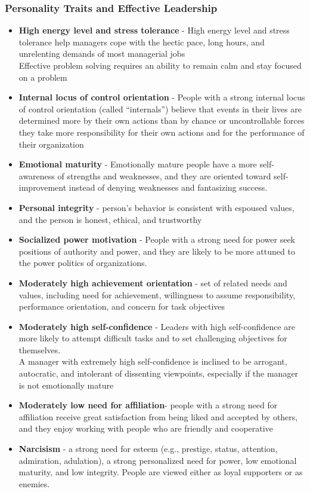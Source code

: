 \subsubsection{Personality Traits and Effective Leadership} %
\label{ssub:personality_traits_and_effective_leadership}


\begin{itemize}
	\item \textbf{High energy level and stress tolerance} - High energy level and stress tolerance help managers cope with the hectic pace, long hours, and unrelenting demands of most managerial jobs
	\\Effective problem solving requires an ability to remain calm and stay focused on a problem
	\item \textbf{Internal locus of control orientation} - People with a strong internal locus of control orientation (called “internals”) believe that events in their lives are determined more by their own actions than by chance or uncontrollable forces 
	\\they take more responsibility for their own actions and for the performance of their organization
	\item \textbf{Emotional maturity} - Emotionally mature people have a more self-awareness of strengths and weaknesses, and they are oriented toward self-improvement instead of denying weaknesses and fantasizing success.
	\item \textbf{Personal integrity} - person’s behavior is consistent with espoused values, and the person is honest, ethical, and trustworthy
	\item \textbf{Socialized power motivation} - People with a strong need for power seek positions of authority and power, and they are likely to be more attuned to the power politics of organizations.
	\item \textbf{Moderately high achievement orientation} - set of related needs and values, including need for achievement, willingness to assume responsibility, performance orientation, and concern for task objectives
	\item \textbf{Moderately high self-confidence} -	Leaders with high self-confidence are more likely to attempt difficult tasks and to set challenging objectives for themselves.
	\\A manager with extremely high self-confidence is inclined to be arrogant, autocratic, and intolerant of dissenting viewpoints, especially if the manager is not emotionally mature
	\item \textbf{Moderately low need for affiliation}- people with a strong need for affiliation receive great satisfaction from being liked and accepted by others, and they enjoy working with people who are friendly and cooperative
	\item \textbf{Narcisism} - a strong need for esteem (e.g., prestige, status, attention, admiration, adulation), a strong personalized need for power, low emotional maturity, and low integrity. People are viewed either as loyal supporters or as enemies.
\end{itemize}

